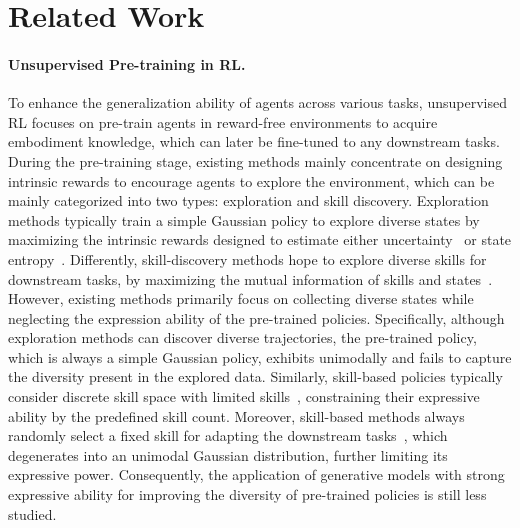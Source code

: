\section{Related Work}
\paragraph{Unsupervised Pre-training in RL.} 
To enhance the generalization ability of agents across various tasks, unsupervised RL focuses on pre-train agents in reward-free environments to acquire embodiment knowledge, which can later be fine-tuned to any downstream tasks. 
During the pre-training stage, existing methods mainly concentrate on designing intrinsic rewards to encourage agents to explore the environment, which can be mainly categorized into two types: exploration and skill discovery. 
Exploration methods typically train a simple Gaussian policy to explore diverse states by maximizing the intrinsic rewards designed to estimate either uncertainty~\cite{pathak2017curiosity,burda2018exploration,pathak2019self,mazzaglia2022curiosity,ying2024peac} or state entropy~\cite{lee2019efficient,liu2021behavior,liu2021aps}. 
Differently, skill-discovery methods hope to explore diverse skills for downstream tasks, by maximizing the mutual information of skills and states~\cite{eysenbach2018diversity,lee2019efficient,campos2020explore,kim2021unsupervised,park2022lipschitz,laskin2022unsupervised,zhao2022mixture,yang2023behavior,park2023metra,bai2024constrained}. 
However, existing methods primarily focus on collecting diverse states while neglecting the expression ability of the pre-trained policies. Specifically, although exploration methods can discover diverse trajectories, the pre-trained policy, which is always a simple Gaussian policy, exhibits unimodally and fails to capture the diversity present in the explored data. 
Similarly, skill-based policies typically consider discrete skill space with limited skills~\cite{eysenbach2018diversity}, constraining their expressive ability by the predefined skill count. Moreover, skill-based methods always randomly select a fixed skill for adapting the downstream tasks~\cite{yang2023behavior}, which degenerates into an unimodal Gaussian distribution, further limiting its expressive power. 
Consequently, the application of generative models with strong expressive ability for improving the diversity of pre-trained policies is still less studied.



